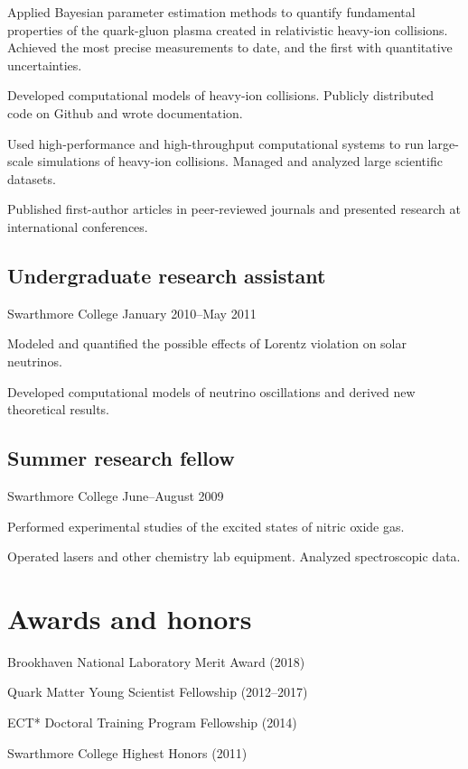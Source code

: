 \documentclass[letterpaper,10pt]{article}
\begin{document}
\begin{multicols}{2}
Applied Bayesian parameter estimation methods to quantify fundamental properties of the quark-gluon plasma created in relativistic heavy-ion collisions.
Achieved the most precise measurements to date, and the first with quantitative uncertainties.

Developed computational models of heavy-ion collisions.
Publicly distributed code on Github and wrote documentation.

Used high-performance and high-throughput computational systems to run large-scale simulations of heavy-ion collisions.
Managed and analyzed large scientific datasets.

Published first-author articles in peer-reviewed journals and presented research at international conferences.

\subsection{Undergraduate research assistant}
\vspace{-\parskip}
{\small Swarthmore College \hfill January 2010--May 2011}

Modeled and quantified the possible effects of Lorentz violation on solar neutrinos.

Developed computational models of neutrino oscillations and derived new theoretical results.

\subsection{Summer research fellow}
\vspace{-\parskip}
{\small Swarthmore College \hfill June--August 2009}

Performed experimental studies of the excited states of nitric oxide gas.

Operated lasers and other chemistry lab equipment.
Analyzed spectroscopic data.


\section{Awards and honors}

Brookhaven National Laboratory Merit Award (2018)

Quark Matter Young Scientist Fellowship (2012--2017)

ECT* Doctoral Training Program Fellowship (2014)

Swarthmore College Highest Honors (2011)



\end{multicols}
\end{document}

